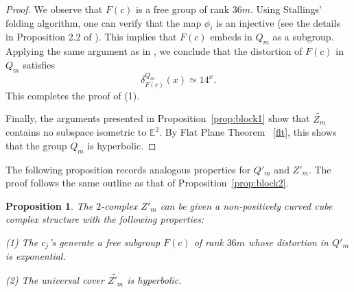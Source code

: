 \documentclass[oneside,11pt,reqno]{amsart}
\newtheorem{prop}[thm]{Proposition}
\theoremstyle{definition}
\DeclareMathOperator{\Lk}{Lk}
\begin{document}
\begin{proof}


We observe that $F(c)$ is a free group of rank $36m$. Using Stallings' folding algorithm, one can verify that the map $\phi_i$ is an injective (see the details in Proposition 2.2 of \cite{BBD}). This implies that $F(c)$ embeds in $Q_m$ as a subgroup. Applying the same argument as in \cite[Proposition 2.2]{BBD}, we conclude that the distortion of $F(c)$ in $Q_m$ satisfies
$$\delta_{F(c)}^{Q_m} (x) \simeq 14^x.$$ This completes the proof of (1).





Finally, the arguments presented in Proposition~\ref{prop:block1} show that $\widetilde{Z_m}$ contains no subspace isometric to $\mathds{E}^2$. By Flat Plane Theorem ~\ref{flt}, this shows that the group $Q_m$ is hyperbolic.

\end{proof}

The following proposition records analogous properties for $Q'_m$ and $Z'_m$. The proof follows the same outline as that of  Proposition~\ref{prop:block2}.

\begin{prop}\label{prop:block2'}
The $2$-complex $Z'_m$ can be given a non-positively curved cube complex structure with the following properties:

(1) The $c_j$'s generate a free subgroup $F(c)$ of rank $36m$ whose distortion in $Q'_m$ is exponential.


(2) The universal cover $\widetilde{Z'_m}$ is hyperbolic.

\end{prop}
\end{document}
